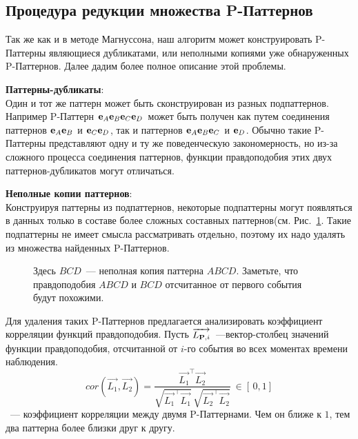 \documentclass[12pt,fсeqn]{article}
\begin{document}
\subsection{Процедура редукции множества P-Паттернов}
Так же как и в методе Магнуссона, наш алгоритм может конструировать
P-Паттерны являющиеся дубликатами, или неполными копиями уже обнаруженных
P-Паттернов. Далее дадим более полное описание этой проблемы.
\begin{trivlist}
\item {\bf Паттерны-дубликаты}:
\\Один и тот же паттерн может быть сконструирован из разных подпаттернов. Например
P-Паттерн ${\bf e}_A{\bf e}_B{\bf e}_C{\bf e}_D$ может быть получен как путем соединения
паттернов ${\bf e}_A{\bf e}_B$ и ${\bf e}_C{\bf e}_D$, так и паттернов ${\bf e}_A{\bf e}_B{\bf e}_C$ и ${\bf e}_D$.
Обычно такие P-Паттерны представляют одну и ту же поведенческую закономерность,
но из-за сложного процесса соединения паттернов, функции правдоподобия
этих двух паттернов-дубликатов могут отличаться.

\item {\bf Неполные копии паттернов}:
\\Конструируя паттерны из подпаттернов, некоторые подпаттерны
могут появляться в данных только в составе более сложных составных
паттернов(см. Рис.~\ref{fig:duppat}. Такие подпаттерны не имеет смысла рассматривать отдельно, поэтому
их надо удалять из множества найденных P-Паттернов.
\end{trivlist}
\begin{figure}[H]
\noindent{}
\caption{ Здесь $BCD$~--- неполная копия паттерна $ABCD$. Заметьте, что правдоподобия 
$ABCD$ и $BCD$ отсчитанное от первого события будут похожими.  }
\label{fig:duppat}
\end{figure}

Для удаления таких P-Паттернов предлагается анализировать
коэффициент корреляции функций правдоподобия. Пусть $\overrightarrow{L_{{\bf P},i}}$~---вектор-столбец
значений функции правдоподобия, отсчитанной от $i$-го события во всех моментах времени наблюдения.
$$
cor\left(\overrightarrow{L_1}, \overrightarrow{L_2}\right) = 
\frac{{\overrightarrow{L_1}}^\top \overrightarrow{L_2}}{ 
\sqrt{ {\overrightarrow{L_1}}^\top \overrightarrow{L_1} }\,\sqrt{ {\overrightarrow{L_2}}^\top \overrightarrow{L_2} } }
\:\in[\,0,1]
$$
~--- коэффициент корреляции между двумя P-Паттернами. Чем он ближе к $1$, тем два паттерна 
более близки друг к другу.
\end{document}
